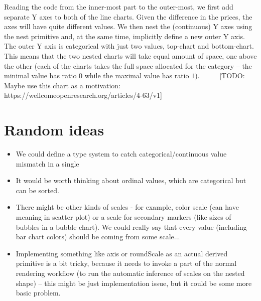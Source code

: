 \documentclass{jfp}
\newcommand{\strf}[1]{\textnormal{\textcolor{strclr}{\sffamily #1}}}
\newcommand{\kvd}[1]{\textnormal{\textcolor{kvdclr}{\sffamily #1}}}
\begin{document}
%
Reading the code from the inner-most part to the outer-most, we first add separate Y axes to both
of the line charts. Given the difference in the prices, the axes will have quite different values.
We then nest the (continuous) Y axes using the \kvd{nest} primitive and, at the same time, implicitly
define a new outer Y axis. The outer Y axis is categorical with just two values, \strf{top-chart}
and \strf{bottom-chart}. This means that the two nested charts will take equal amount of space,
one above the other (each of the charts takes the full space allocated for the category -- the
minimal value has ratio $0$ while the maximal value has ratio $1$).
~
~
~
[TODO: Maybe use this chart as a motivation: https://wellcomeopenresearch.org/articles/4-63/v1]
~
\section{Random ideas}
\begin{itemize}
\item We could define a type system to catch categorical/continuous value mismatch in a single %
\item It would be worth thinking about ordinal values, which are categorical but can be sorted.
\item There might be other kinds of scales - for example, color scale (can have meaning in scatter plot)
 or a scale for secondary markers (like sizes of bubbles in a bubble chart). We could really say that
 every value (including bar chart colors) should be coming from some scale...
\item Implementing something like \kvd{axis} or \kvd{roundScale} as an actual derived primitive is
 a bit tricky, because it needs to invoke a part of the normal rendering workflow (to run the
 automatic inference of scales on the nested shape) -- this might be just implementation issue,
 but it could be some more basic problem.
\end{itemize}
\end{document}
